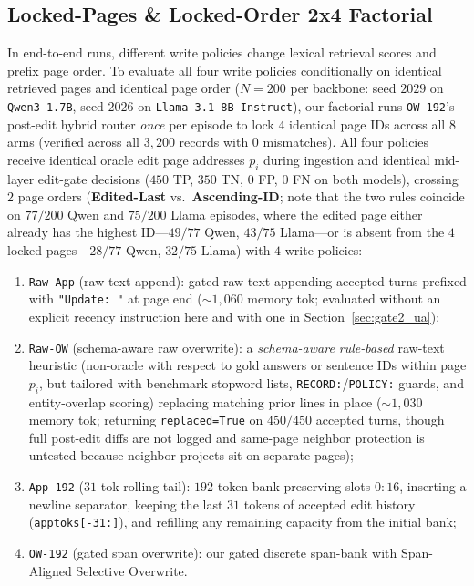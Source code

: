 \documentclass[10pt]{article}
\renewcommand{\_}{\origunderscore\allowbreak}
\begin{document}
\subsection{Locked-Pages \& Locked-Order 2x4 Factorial}
\label{sec:gate2_factorial}
In end-to-end runs, different write policies change lexical retrieval scores and prefix page order. To evaluate all four write policies conditionally on identical retrieved pages and identical page order ($N=200$ per backbone: seed $2029$ on \texttt{Qwen3-1.7B}, seed $2026$ on \texttt{Llama-3.1-8B-Instruct}), our factorial runs \texttt{OW-192}'s post-edit hybrid router \emph{once} per episode to lock $4$ identical page IDs across all $8$ arms (verified across all $3{,}200$ records with $0$ mismatches). All four policies receive identical oracle edit page addresses $p_i$ during ingestion and identical mid-layer edit-gate decisions ($450$ TP, $350$ TN, $0$ FP, $0$ FN on both models), crossing $2$ page orders (\textbf{Edited-Last} vs.\ \textbf{Ascending-ID}; note that the two rules coincide on $77/200$ Qwen and $75/200$ Llama episodes, where the edited page either already has the highest ID---$49/77$ Qwen, $43/75$ Llama---or is absent from the $4$ locked pages---$28/77$ Qwen, $32/75$ Llama) with $4$ write policies:
\begin{enumerate}
    \item \texttt{Raw-App} (raw-text append): gated raw text appending accepted turns prefixed with \texttt{"Update: "} at page end ($\sim 1{,}060$ memory tok; evaluated without an explicit recency instruction here and with one in Section~\ref{sec:gate2_ua});
    \item \texttt{Raw-OW} (schema-aware raw overwrite): a \emph{schema-aware rule-based} raw-text heuristic (non-oracle with respect to gold answers or sentence IDs within page $p_i$, but tailored with benchmark stopword lists, \texttt{RECORD:}/\texttt{POLICY:} guards, and entity-overlap scoring) replacing matching prior lines in place ($\sim 1{,}030$ memory tok; returning \texttt{replaced=True} on $450/450$ accepted turns, though full post-edit diffs are not logged and same-page neighbor protection is untested because neighbor projects sit on separate pages);
    \item \texttt{App-192} ($31$-tok rolling tail): $192$-token bank preserving slots $0{:}16$, inserting a newline separator, keeping the last $31$ tokens of accepted edit history (\texttt{app\_toks[-31:]}), and refilling any remaining capacity from the initial bank;
    \item \texttt{OW-192} (gated span overwrite): our gated discrete span-bank with Span-Aligned Selective Overwrite.
\end{enumerate}
\end{document}

